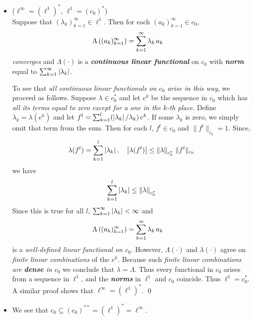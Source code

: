 \documentclass[11pt]{article}
\begin{document}
\begin{itemize}
\item \begin{example} ($\ell^{\infty} = (\ell^1)^{*}$, $\ell^1 = (c_0)^{*}$)\\
Suppose that $(\lambda_k)_{k= 1}^{\infty} \in \ell^1$. Then for each $(a_k)_{k=1}^{\infty} \in c_0$,
\begin{align*}
\Lambda\left((a_k)_{k=1}^{\infty}\right) &= \sum_{k=1}^{\infty}\lambda_k\, a_k
\end{align*} \emph{converges} and $\Lambda(\cdot)$ is a \emph{\textbf{continuous linear functional}} on $c_0$ with \emph{\textbf{norm}} equal
to $\sum_{k=1}^{\infty}\left\lvert \lambda_k \right\rvert$. 

To see that \emph{all continuous linear functionals on $c_0$  arise in this way}, we proceed as follows. Suppose $\lambda \in c_0^{*}$ and let $e^k$ be the sequence in $c_0$ which has \emph{all its terms equal to zero except for a one in the $k$-th place}. Define $\lambda_k = \lambda(e^k)$ and let $f^{l} =\sum_{k=1}^{l}( \left\lvert \lambda_k \right\rvert / \lambda_k )\, e^k$. If some $\lambda_k$ is zero, we simply omit that term from the sum. Then for each $l$, $f^{l}\in c_0$ and $\|f^l\|_{c_0} = 1$. Since,
\begin{align*}
\lambda(f^l) = \sum_{k=1}^{l}\left\lvert \lambda_k \right\rvert, \quad \left\lvert \lambda(f^l) \right\rvert \le \left\|\lambda\right\|_{c_0^{*}}\,\|f^l\|_{c_0}
\end{align*}
we have
\begin{align*}
 \sum_{k=1}^{l}\left\lvert \lambda_k \right\rvert \le \left\|\lambda\right\|_{c_0^{*}}
\end{align*}
Since this is true for all $l$, $ \sum_{k=1}^{\infty}\left\lvert \lambda_k \right\rvert< \infty$ and
\begin{align*}
\Lambda\left((a_k)_{k=1}^{\infty}\right) &= \sum_{k=1}^{\infty}\lambda_k\, a_k
\end{align*} is a \emph{well-defined linear functional on $c_0$}. However, $\Lambda(\cdot)$ and $\lambda(\cdot)$ agree on \emph{finite linear combinations} of the $e^k$. Because such \emph{finite linear combinations are \textbf{dense} in $c_0$} we conclude that $\lambda = \Lambda$. Thus every functional in $c_0$ arises
from a sequence in $\ell^1$, and the \emph{\textbf{norms}} in $\ell^1$ and $c_0$ coincide. Thus $\ell^1 = c_0^{*}$. A similar proof shows that $\ell^{\infty} = (\ell^1)^{*}$. \qed
\end{example}

\item \begin{remark}
We see that $c_0 \subseteq  (c_0)^{**} = (\ell^1)^{*} = \ell^{\infty}$.
\end{remark}


\end{itemize}
\end{document}
